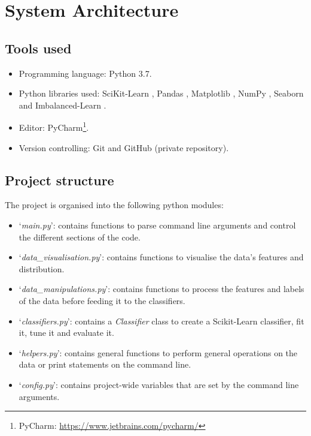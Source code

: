\documentclass[letterpaper,12pt]{article}
\begin{document}
\section{System Architecture}
\label{sec:system-architecture}

\subsection{Tools used}

\begin{itemize}
    \item Programming language: Python 3.7.
    \item Python libraries used: SciKit-Learn \cite{scikit-learn}, Pandas \cite{reback2020pandas}, Matplotlib \cite{Hunter:2007}, NumPy \cite{numpy},  Seaborn \cite{seaborn} and Imbalanced-Learn \cite{JMLR:v18:16-365}.
    \item Editor: PyCharm\footnote{PyCharm: \url{https://www.jetbrains.com/pycharm/}}.
    \item Version controlling: Git and GitHub (private repository).
\end{itemize}

\subsection{Project structure}

The project is organised into the following python modules:
\begin{itemize}
    \item `\textit{main.py}': contains functions to parse command line arguments and control the different sections of the code.
    \item `\textit{data\_visualisation.py}': contains functions to visualise the data's features and distribution.
    \item `\textit{data\_manipulations.py}': contains functions to process the features and labels of the data before feeding it to the classifiers.
    \item `\textit{classifiers.py}': contains a \textit{Classifier} class to create a Scikit-Learn classifier, fit it, tune it and evaluate it.
    \item `\textit{helpers.py}': contains general functions to perform general operations on the data or print statements on the command line.
    \item `\textit{config.py}': contains project-wide variables that are set by the command line arguments.
\end{itemize}
\end{document}
